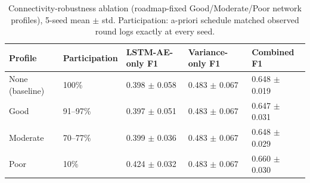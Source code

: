 \begin{table}[t]
\centering
\caption{Connectivity-robustness ablation (roadmap-fixed Good/Moderate/Poor network profiles), 5-seed mean $\pm$ std. Participation: a-priori schedule matched observed round logs exactly at every seed.}
\label{tab:m3-connectivity}
\begin{tabular}{@{}lllll@{}}
\toprule
Profile & Participation & LSTM-AE-only F1 & Variance-only F1 & Combined F1 \\
\midrule
None (baseline) & 100\% & 0.398 $\pm$ 0.058 & 0.483 $\pm$ 0.067 & 0.648 $\pm$ 0.019 \\
Good & 91--97\% & 0.397 $\pm$ 0.051 & 0.483 $\pm$ 0.067 & 0.647 $\pm$ 0.031 \\
Moderate & 70--77\% & 0.399 $\pm$ 0.036 & 0.483 $\pm$ 0.067 & 0.648 $\pm$ 0.029 \\
Poor & 10\% & 0.424 $\pm$ 0.032 & 0.483 $\pm$ 0.067 & 0.660 $\pm$ 0.030 \\
\bottomrule
\end{tabular}
\end{table}
